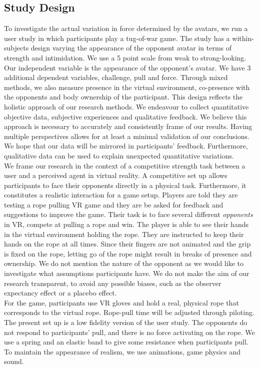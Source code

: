 \subsection{Study Design}
To investigate the actual variation in force determined by the avatars, we run a user study in which participants play a tug-of-war game. The study has a within-subjects design varying the appearance of the opponent avatar in terms of strength and intimidation. We use a 5 point scale from weak to strong-looking. Our independent variable is the appearance of the opponent's avatar. We have 3 additional dependent variables, challenge, pull and force. Through mixed methods, we also measure presence in the virtual environment, co-presence with the opponents and body ownership of the participant. This design reflects the holistic approach of our research methods. We endeavour to collect quantitative objective data, subjective experiences and qualitative feedback. We believe this approach is necessary to accurately and consistently frame of our results. Having multiple perspectives allows for at least a minimal validation of our conclusions. We hope that our data will be mirrored in participants' feedback. Furthermore, qualitative data can be used to explain unexpected quantitative variations.
\\
We frame our research in the context of a competitive strength task between a user and a perceived agent in virtual reality. A competitive set up allows participants to face their opponents directly in a physical task. Furthermore, it constitutes a realistic interaction for a game setup.  Players are told they are testing a rope pulling VR game and they are be asked for feedback and suggestions to improve the game.
Their task is to face several different \textit{opponents} in VR, compete at pulling a rope and win. The player is able to see their hands in the virtual environment holding the rope. They are instructed to keep their hands on the rope at all times. Since their fingers are not animated and the grip is fixed on the rope, letting go of the rope might result in breaks of presence and ownership. We do not mention the nature of the opponent as we would like to investigate what assumptions participants have. We do not make the aim of our research transparent, to avoid any possible biases, such as the observer expectancy effect or a placebo effect. 
\\
For the game, participants use VR gloves and hold a real, physical rope that corresponds to the virtual rope. Rope-pull time will be adjusted through piloting. The present set up is a low fidelity version of the user study. The opponents do not respond to participants' pull, and there is no force activating on the rope. We use a spring and an elastic band to give some resistance when participants pull. To maintain the appearance of realism, we use animations, game physics and sound.\\

